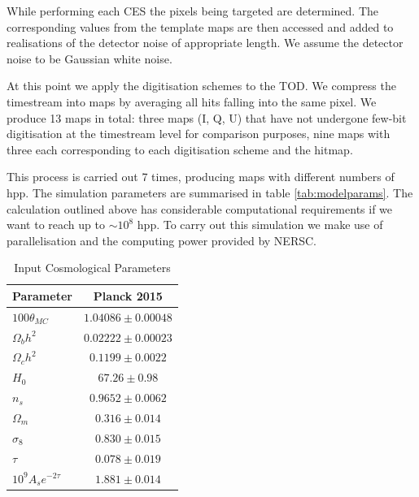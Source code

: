 \documentclass[apj]{emulateapj}
\begin{document}
While performing each CES the pixels being targeted are determined. The corresponding values from the template maps are then accessed and added to realisations of the detector noise of appropriate length. We assume the detector noise to be Gaussian white noise.

At this point we apply the digitisation schemes to the TOD. We compress the timestream into maps by averaging all hits falling into the same pixel. We produce 13 maps in total: three maps (I, Q, U) that have not undergone few-bit digitisation at the timestream level for comparison purposes, nine maps with three each corresponding to each digitisation scheme and the hitmap.

This process is carried out 7 times, producing maps with different numbers of hpp. The simulation parameters are summarised in table \ref{tab:modelparams}. The calculation outlined above has considerable computational requirements if we want to reach up to $\sim 10^8$ hpp. To carry out this simulation we make use of parallelisation and the computing power provided by NERSC.

\begin{table}[tbh]
\begin{center}
\caption{\label{tab:inputcosparams} Input Cosmological Parameters}
\small
\begin{tabular}{l | c}
Parameter & Planck 2015\\
\hline
$100\theta_{MC}$ & $ 1.04086 \pm 0.00048$\\
$\Omega_b h^2$ & $  0.02222 \pm 0.00023$\\
$\Omega_c h^2$ & $ 0.1199 \pm 0.0022$\\
$H_0$ & $67.26 \pm 0.98$\\
$n_s$ & $0.9652 \pm 0.0062$\\
$\Omega_m$ & $0.316 \pm 0.014$\\
$\sigma_8$ & $0.830 \pm 0.015 $\\
$\tau$ & $0.078 \pm 0.019$\\
$10^9 A_s e^{-2\tau}$ & $1.881 \pm 0.014 $\\
\end{tabular}
 \normalsize
\end{center}
\end{table}
\end{document}
